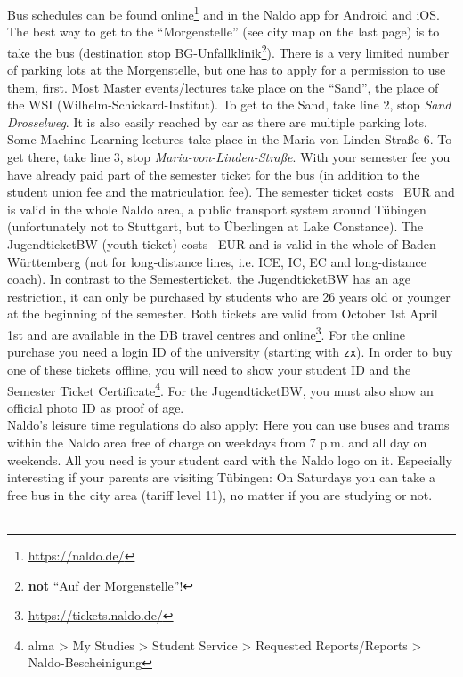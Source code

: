 \ifml
    Bus schedules can be found online\footnote{\url{https://naldo.de/}} and in the Naldo app for Android and iOS.\\
    The best way to get to the "`Morgenstelle"' (see city map on the last page) is to take the bus (destination stop BG-Unfallklinik\footnote{\textbf{not} "`Auf der Morgenstelle"'!}). There is a very limited number of parking lots at the Morgenstelle, but one has to apply for a permission to use them, first.
    Most Master events/lectures take place on the "`Sand"', the place of the WSI (Wilhelm-Schickard-Institut). To get to the Sand, take line 2, stop \emph{Sand Drosselweg}. It is also easily reached by car as there are multiple parking lots.
    Some Machine Learning lectures take place in the Maria-von-Linden-Straße 6. To get there, take line 3, stop \emph{Maria-von-Linden-Straße}.
    With your semester fee you have already paid part of the semester ticket for the bus (in addition to the student union fee and the matriculation fee).
    The semester ticket costs \semesterticketpreis~EUR and is valid in the whole Naldo area, a public transport system around
    Tübingen (unfortunately not to Stuttgart, but to Überlingen at Lake Constance).
    The JugendticketBW (youth ticket) costs \jugendticketbwpreis~EUR and is valid in the whole of Baden-Württemberg (not for long-distance lines, i.e. ICE, IC, EC and long-distance coach).
    In contrast to the Semesterticket, the JugendticketBW has an age restriction, it can only be purchased by students who are 26 years old or younger at the beginning of the semester.
    Both tickets are valid from
    \ifwintersemester
    October 1st
    \fi
    \ifsommersemester
    April 1st
    \fi
    and are available in the DB travel centres and online\footnote{\url{https://tickets.naldo.de/}}. For the online purchase you need a login ID of the university (starting with \texttt{zx}).
    In order to buy one of these tickets offline, you will need to show your student ID and the Semester Ticket Certificate\footnote{alma > My Studies > Student Service > Requested Reports/Reports > Naldo-Bescheinigung}. For the JugendticketBW, you must also show an official photo ID as proof of age.\\
    Naldo's leisure time regulations do also apply: Here you can use buses and trams within the Naldo area free of charge on weekdays from 7 p.m. and all day on weekends. All you need is your student card with the Naldo logo on it.
    Especially interesting if your parents are visiting Tübingen: On Saturdays you can take a free bus in the city area (tariff level 11), no matter if you are studying or not.\\ \\

